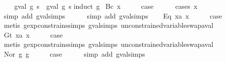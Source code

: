 \begin{isabellebody}
\ \ \ \ gval\ g\ s\ {\isacharequal}\ gval\ g\ s{\isacharprime}{\isachardoublequoteclose}\isanewline
%
\isadelimproof
%
\endisadelimproof
%
\isatagproof
{}\isamarkupfalse%
{\isacharparenleft}induct\ g{\isacharparenright}\isanewline
{}\isamarkupfalse%
\ {\isacharparenleft}Bc\ x{\isacharparenright}\isanewline
\ \ \isamarkupfalse%
\ \isamarkupfalse%
\ {\isacharquery}case\isanewline
\ \ \ \ \isamarkupfalse%
\ {\isacharparenleft}cases\ x{\isacharparenright}\isanewline
\ \ \ \ \ \isamarkupfalse%
\ {\isacharparenleft}simp\ add{\isacharcolon}\ gval{\isachardot}simps{\isacharparenleft}{}{\isacharparenright}{\isacharparenright}\isanewline
\ \ \ \ \isamarkupfalse%
\ {\isacharparenleft}simp\ add{\isacharcolon}\ gval{\isachardot}simps{\isacharparenleft}{}{\isacharparenright}{\isacharparenright}\isanewline
{}\isamarkupfalse%
\isanewline
\ \ \isamarkupfalse%
\ {\isacharparenleft}Eq\ x{}a\ x{}{\isacharparenright}\isanewline
\ \ \isamarkupfalse%
\ \isamarkupfalse%
\ {\isacharquery}case\isanewline
\ \ \ \ \isamarkupfalse%
\ {\isacharparenleft}metis\ gexp{\isacharunderscore}constrains{\isachardot}simps{\isacharparenleft}{}{\isacharparenright}\ gval{\isachardot}simps{\isacharparenleft}{}{\isacharparenright}\ unconstrained{\isacharunderscore}variable{\isacharunderscore}swap{\isacharunderscore}aval{\isacharparenright}\isanewline
{}\isamarkupfalse%
\isanewline
\ \ \isamarkupfalse%
\ {\isacharparenleft}Gt\ x{}a\ x{}{\isacharparenright}\isanewline
\ \ \isamarkupfalse%
\ \isamarkupfalse%
\ {\isacharquery}case\isanewline
\ \ \ \ \isamarkupfalse%
\ {\isacharparenleft}metis\ gexp{\isacharunderscore}constrains{\isachardot}simps{\isacharparenleft}{}{\isacharparenright}\ gval{\isachardot}simps{\isacharparenleft}{}{\isacharparenright}\ unconstrained{\isacharunderscore}variable{\isacharunderscore}swap{\isacharunderscore}aval{\isacharparenright}\isanewline
{}\isamarkupfalse%
\isanewline
\ \ \isamarkupfalse%
\ {\isacharparenleft}Nor\ g{}\ g{}{\isacharparenright}\isanewline
\ \ \isamarkupfalse%
\ \isamarkupfalse%
\ {\isacharquery}case\isanewline
\ \ \ \ \isamarkupfalse%
\ {\isacharparenleft}simp\ add{\isacharcolon}\ gval{\isachardot}simps{\isacharparenleft}{}{\isacharparenright}{\isacharparenright}\isanewline

\end{isabellebody}
